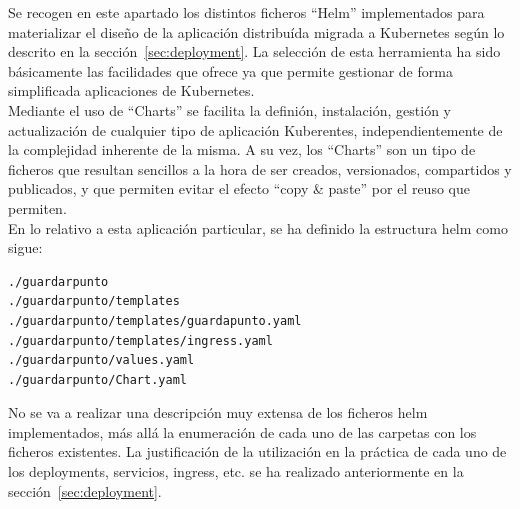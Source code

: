 \documentclass[12pt,spanish]{article}
\begin{document}
Se recogen en este apartado los distintos ficheros ``Helm'' implementados para materializar el diseño de la aplicación distribuída migrada a Kubernetes según lo descrito en la sección~\ref{sec:deployment}. La selección de esta herramienta ha sido básicamente las facilidades que ofrece ya que permite gestionar de forma simplificada aplicaciones de Kubernetes.\\
Mediante el uso de ``Charts'' se facilita la definión, instalación, gestión y actualización de cualquier tipo de aplicación Kuberentes, independientemente de la complejidad inherente de la misma. A su vez, los ``Charts'' son un tipo de ficheros que resultan sencillos a la hora de ser creados, versionados, compartidos y publicados, y que permiten evitar el efecto ``copy \& paste'' por el reuso que permiten.\\
En lo relativo a esta aplicación particular, se ha definido la estructura helm como sigue:
\begin{verbatim}
./guardarpunto
./guardarpunto/templates
./guardarpunto/templates/guardapunto.yaml
./guardarpunto/templates/ingress.yaml
./guardarpunto/values.yaml
./guardarpunto/Chart.yaml
\end{verbatim}
No se va a realizar una descripción muy extensa de los ficheros helm implementados, más allá la enumeración de cada uno de las carpetas con los ficheros existentes. La justificación de la utilización en la práctica de cada uno de los deployments, servicios, ingress, etc. se ha realizado anteriormente en la sección~\ref{sec:deployment}.
\end{document}
